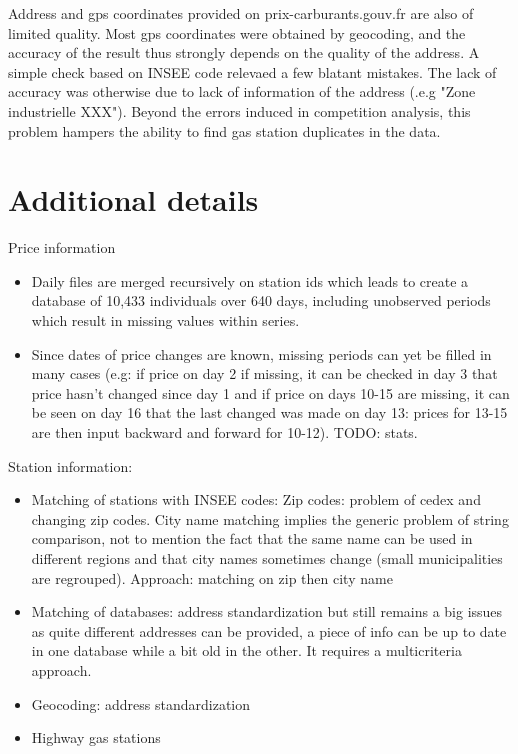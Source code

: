 \documentclass[11pt]{article}
\begin{document}
Address and gps coordinates provided on prix-carburants.gouv.fr are also of limited quality. Most gps coordinates were obtained by geocoding, and the accuracy of the result thus strongly depends on the quality of the address. A simple check based on INSEE code relevaed a few blatant mistakes. The lack of accuracy was otherwise due to lack of information of the address (.e.g "Zone industrielle XXX"). Beyond the errors induced in competition analysis, this problem hampers the ability to find gas station duplicates in the data.

\clearpage

\appendix

\section{Additional details}

Price information
\begin{itemize}
\item Daily files are merged recursively on station ids which leads to create a database of 10,433 individuals over 640 days, including unobserved periods which result in missing values within series. 
\item Since dates of price changes are known, missing periods can yet be filled in many cases (e.g: if price on day 2 if missing, it can be checked in day 3 that price hasn't changed since day 1 and if price on days 10-15 are missing, it can be seen on day 16 that the last changed was made on day 13: prices for 13-15 are then input backward and forward for 10-12). TODO: stats.
\end{itemize}

Station information:
\begin{itemize}
\item Matching of stations with INSEE codes: Zip codes: problem of cedex and changing zip codes. City name matching implies the generic problem of string comparison, not to mention the fact that the same name can be used in different regions and that city names sometimes change (small municipalities are regrouped). Approach: matching on zip then city name
\item Matching of databases: address standardization but still remains a big issues as quite different addresses can be provided, a piece of info can be up to date in one database while a bit old in the other. It requires a multicriteria approach.
\item Geocoding: address standardization
\item Highway gas stations
\end{itemize}
\end{document}
